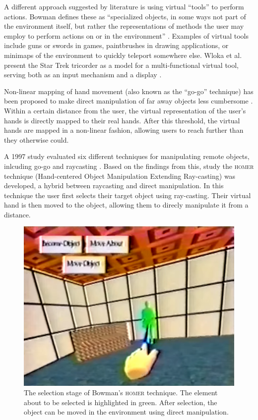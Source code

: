 \documentclass[nobib]{tufte-book} %
\begin{document}
A different approach suggested by literature is using virtual ``tools'' to perform actions. Bowman defines these as ``specialized objects, in some ways not part of the environment itself, but rather the representations of methods the user may employ to perform actions on or in the environment'' \cite{bowman1995user}. Examples of virtual tools include guns or swords in games, paintbrushes in drawing applications, or minimaps of the environment to quickly teleport somewhere else. Wloka et al. present the Star Trek tricorder as a model for a multi-functional virtual tool, serving both as an input mechanism and a display \cite{wloka1995virtual}.

\newpage

Non-linear mapping of hand movement (also known as the ``go-go'' technique) has been proposed to make direct manipulation of far away objects less cumbersome \cite{poupyrev1996go}. Within a certain distance from the user, the virtual representation of the user's hands is directly mapped to their real hands. After this threshold, the virtual hands are mapped in a non-linear fashion, allowing users to reach further than they otherwise could.

A 1997 study evaluated six different techniques for manipulating remote objects, inlcuding go-go and raycasting \cite{bowman1997evaluation}. Based on the findings from this, study the \textsc{homer} technique (Hand-centered Object Manipulation Extending Ray-casting) was developed, a hybrid between raycasting and direct manipulation. In this technique the user first selects their target object using ray-casting. Their virtual hand is then moved to the object, allowing them to direcly manipulate it from a distance.

\begin{figure}
  \includegraphics{homer.png}
  \caption{The selection stage of Bowman's \textsc{homer} technique. The element about to be selected is highlighted in green. After selection, the object can be moved in the environment using direct manipulation.}
  \label{fig:homer}
\end{figure}
\end{document}
